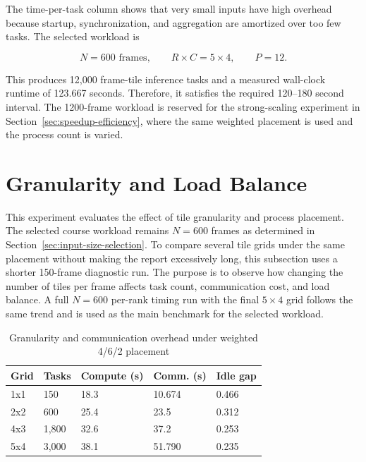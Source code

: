 The time-per-task column shows that very small inputs have high overhead because startup, synchronization, and aggregation are amortized over too few tasks. The selected workload is

\[
N = 600 \text{ frames}, \qquad R \times C = 5 \times 4, \qquad P = 12.
\]

This produces 12,000 frame-tile inference tasks and a measured wall-clock runtime of 123.667 seconds. Therefore, it satisfies the required 120--180 second interval. The 1200-frame workload is reserved for the strong-scaling experiment in Section~\ref{sec:speedup-efficiency}, where the same weighted placement is used and the process count is varied.


\section{Granularity and Load Balance}\label{sec:granularity-load-balance}

This experiment evaluates the effect of tile granularity and process placement. The selected course workload remains $N = 600$ frames as determined in Section~\ref{sec:input-size-selection}. To compare several tile grids under the same placement without making the report excessively long, this subsection uses a shorter 150-frame diagnostic run. The purpose is to observe how changing the number of tiles per frame affects task count, communication cost, and load balance. A full $N=600$ per-rank timing run with the final $5\times4$ grid follows the same trend and is used as the main benchmark for the selected workload.

\begin{table}[H]
\centering
\caption{Granularity and communication overhead under weighted 4/6/2 placement}
\label{tab:granularity}
\small
\begin{tabularx}{\textwidth}{C{1.8cm} C{1.6cm} C{1.7cm} C{2.0cm} C{1.8cm}}
\toprule
Grid & Tasks & Compute (s) & Comm. (s) & Idle gap \\
\midrule
1x1 & 150 & 18.3 & 10.674 & 0.466 \\
2x2 & 600 & 25.4 & 23.5 & 0.312 \\
4x3 & 1,800 & 32.6 & 37.2 & 0.253 \\
5x4 & 3,000 & 38.1 & 51.790 & 0.235 \\
\bottomrule
\end{tabularx}
\end{table}

